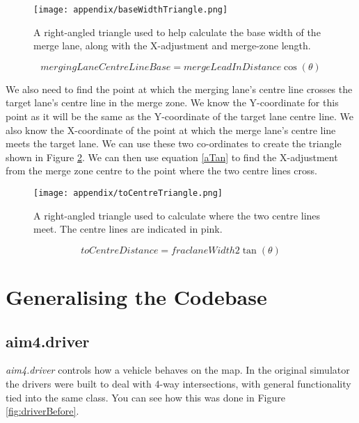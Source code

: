 \begin{appendices}
\begin{figure}[htb]
\centering
\texttt{[image: appendix/baseWidthTriangle.png]}
\caption{A right-angled triangle used to help calculate the base width of the merge lane, along with the X-adjustment and merge-zone length.}
\label{fig:baseWidthTriangle}
\end{figure}

\begin{equation}\label{aCos}
mergingLaneCentreLineBase = mergeLeadInDistance \cos(\theta)
\end{equation}

We also need to find the point at which the merging lane's centre line crosses the target lane's centre line in the merge zone. We know the Y-coordinate for this point as it will be the same as the Y-coordinate of the target lane centre line. We also know the X-coordinate of the point at which the merge lane's centre line meets the target lane. We can use these two co-ordinates to create the triangle shown in Figure \ref{fig:toCentreTriangle}. We can then use equation \ref{aTan} to find the X-adjustment from the merge zone centre to the point where the two centre lines cross.

\begin{figure}[htb]
\centering
\texttt{[image: appendix/toCentreTriangle.png]}
\caption{A right-angled triangle used to calculate where the two centre lines meet. The centre lines are indicated in pink.}
\label{fig:toCentreTriangle}
\end{figure}

\begin{equation}\label{aTan}
toCentreDistance = frac{laneWidth}{2 \tan(\theta)}
\end{equation}

\section{Generalising the Codebase}
\label{sec:Generalising the Codebase Appendix}

\subsection{aim4.driver}
\label{subsec:aim4.driver}
\emph{aim4.driver} controls how a vehicle behaves on the map. In the original simulator the drivers were built to deal with 4-way intersections, with general functionality tied into the same class. You can see how this was done in Figure \ref{fig:driverBefore}.


\end{appendices}
